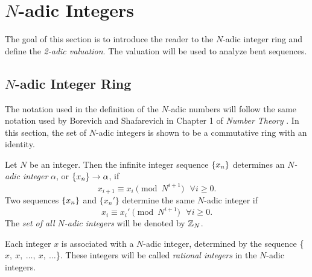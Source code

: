 \section{$N$-adic Integers}
\par The goal of this section is to introduce the reader to the $N$-adic
integer ring and define the {\em 2-adic valuation}. The valuation will be
used to analyze bent sequences.

\subsection{$N$-adic Integer Ring}
\par The notation used in the definition of the $N$-adic numbers will follow
the same notation used by Borevich and Shafarevich in Chapter 1 of
{\em Number Theory} \cite{bk:bs66}. In this section, the set of $N$-adic
integers is shown to be a commutative ring with an identity.
  
\begin{definition}
\label{def:N-adic}
  Let $N$ be an integer. Then the infinite integer sequence $\{x_n\}$
  determines an {\em $N$-adic integer} $\alpha$, or
  $\{x_n\} \rightarrow \alpha$, if
  \begin{equation} \label{eq:seq}
  x_{i+1} \equiv x_i\pmod{N^{i+1}} \ \ \ \forall i \geq 0.
  \end{equation}
  Two sequences $\{x_n\}$ and $\{x_n'\}$ determine the same $N$-adic integer if 
\begin{equation} \label{eq:equiv}
  x_i \equiv x_i' \pmod{N^{i+1}}\ \ \ \forall i \geq 0.
\end{equation}
  The {\em set of all $N$-adic integers} will be denoted by $\mathbb{Z}_N$.
\end{definition}

\par Each integer $x$ is associated with a $N$-adic integer, determined
by the sequence \{$x,\ x, \ \dots, \ x,\ \dots$\}. These integers will be
called {\em rational integers} in the $N$-adic integers.
	
